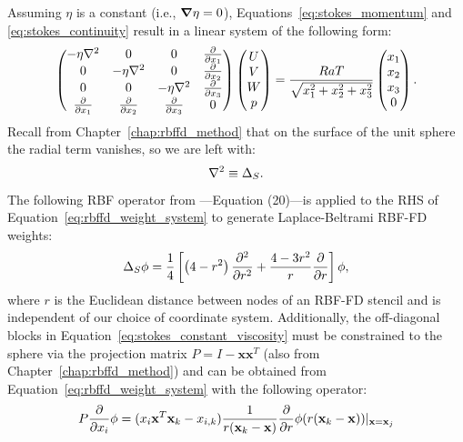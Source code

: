 Assuming $\eta$ is a constant (i.e., $\mbox{\boldmath$ \nabla $} \eta = 0$), Equations~\ref{eq:stokes_momentum} and \ref{eq:stokes_continuity} result in a linear system of the following form:
\begin{align}
\begin{pmatrix}
-\eta \Laplacian & 0 & 0 & \pd{}{x_1} \\ 
0 & -\eta \Laplacian & 0 & \pd{}{x_2} \\ 
0 & 0 & -\eta \Laplacian & \pd{}{x_3} \\ 
\pd{}{x_1} & \pd{}{x_2} & \pd{}{x_3} & 0 \\
\end{pmatrix} \begin{pmatrix}
U \\ V \\ W \\ p 
\end{pmatrix} = \frac{RaT}{\sqrt{x_1^2 + x_2^2 + x_3^2}}\begin{pmatrix} x_1 \\ x_2 \\ x_3 \\ 0\end{pmatrix}.
\label{eq:stokes_constant_viscosity}
\end{align} 
Recall from Chapter~\ref{chap:rbffd_method} that on the surface of the unit sphere the radial term vanishes, so we are left with:
\begin{align*}
\nabla^2 \equiv \Delta_S . 
\end{align*}
The following RBF operator from \cite{WrightFlyerYuen10}---Equation (20)---is applied to the RHS of Equation~\ref{eq:rbffd_weight_system} to generate Laplace-Beltrami RBF-FD weights: 
\begin{align*} 
\Delta_S \phi = \frac{1}{4} \left[ \left(4-r^2\right) \frac{\partial^2 }{\partial r^2} + \frac{4-3r^2}{r} \frac{\partial }{\partial r} \right] \phi,
\end{align*} 
where $r$ is the Euclidean distance between nodes of an RBF-FD stencil and is independent of our choice of coordinate system. 
Additionally, the off-diagonal blocks in Equation~\ref{eq:stokes_constant_viscosity} must be constrained to the sphere via the projection matrix $P = I - \mathbf{x} \mathbf{x}^T$ (also from Chapter~\ref{chap:rbffd_method}) and can be obtained from Equation~\ref{eq:rbffd_weight_system} with the following operator:  
\begin{align*} 
P\frac{\partial }{\partial x_i} \phi = ( x_i \mathbf{x}^T \mathbf{x}_k - x_{i,k}) \frac{1}{r(\mathbf{x}_k - \mathbf{x})}  \frac{\partial }{\partial r} \phi(r(\mathbf{x}_k - \mathbf{x})) |_{\mathbf{x}=\mathbf{x}_j} 
\end{align*}
